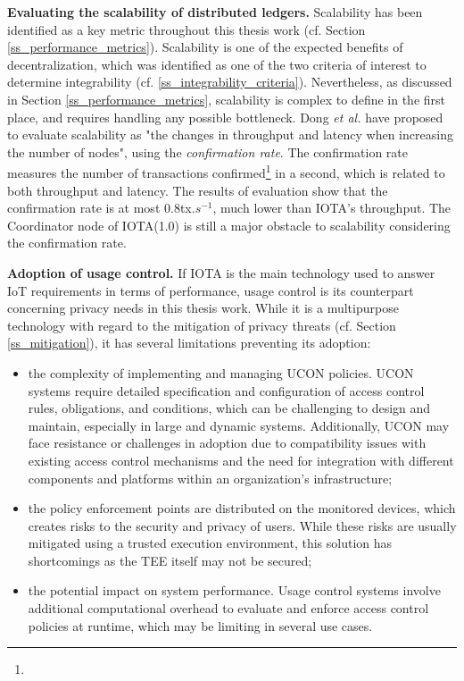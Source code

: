 \textbf{Evaluating the scalability of distributed ledgers.} Scalability has been identified as a key metric throughout this thesis work (cf. Section \ref{ss_performance_metrics}). Scalability is one of the expected benefits of decentralization, which was identified as 
one of the two criteria of interest to determine integrability (cf. \ref{ss_integrability_criteria}). Nevertheless, as discussed in Section \ref{ss_performance_metrics}, scalability is complex to define in the first place, and requires handling any possible bottleneck. 
Dong \emph{et al.} \cite{Dong2019} have proposed to evaluate scalability as "the changes in throughput and latency
when increasing the number of nodes", using the \emph{confirmation rate}. The confirmation rate measures the number of transactions confirmed\footnote{} in a second, which is related to both throughput and latency. The results of  evaluation show that the confirmation 
rate is at most 0.8tx.$s^{-1}$, much lower than IOTA's throughput. The Coordinator node of IOTA(1.0) is still a major obstacle to scalability considering the confirmation rate.

\textbf{Adoption of usage control.} If IOTA is the main technology used to answer IoT requirements in terms of performance, usage control is its counterpart concerning privacy needs in this thesis work. 
While it is a multipurpose technology with regard to the mitigation of privacy threats (cf. Section \ref{ss_mitigation}), it has several limitations preventing its adoption:

\begin{itemize}
    \item the complexity of implementing and managing UCON policies. UCON systems require detailed specification and configuration of access control rules, obligations, and conditions, which can be challenging to design and maintain, especially in large and dynamic systems. Additionally, UCON may face resistance or challenges in adoption due to compatibility issues with existing access control mechanisms and the need for integration with different components and platforms within an organization's infrastructure;
    \item the policy enforcement points are distributed on the monitored devices, which creates risks to the security and privacy of users. While these risks are usually mitigated using a trusted execution environment, this solution has shortcomings as the TEE itself may not be secured;
    \item the potential impact on system performance. Usage control systems involve additional computational overhead to evaluate and enforce access control policies at runtime, which may be limiting in several use cases. 
\end{itemize}


